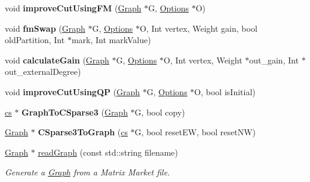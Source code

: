 \begin{DoxyCompactItemize}
\item 
\hypertarget{namespace_mongoose_acb49900518e10126690fb51a170ce20f}{}\label{namespace_mongoose_acb49900518e10126690fb51a170ce20f} 
void {\bfseries improve\+Cut\+Using\+FM} (\hyperlink{class_mongoose_1_1_graph}{Graph} $\ast$G, \hyperlink{struct_mongoose_1_1_options}{Options} $\ast$O)
\item 
\hypertarget{namespace_mongoose_af3413f738c2ef291db0d26e13c55bf48}{}\label{namespace_mongoose_af3413f738c2ef291db0d26e13c55bf48} 
void {\bfseries fm\+Swap} (\hyperlink{class_mongoose_1_1_graph}{Graph} $\ast$G, \hyperlink{struct_mongoose_1_1_options}{Options} $\ast$O, Int vertex, Weight gain, bool old\+Partition, Int $\ast$mark, Int mark\+Value)
\item 
\hypertarget{namespace_mongoose_aeae6a68c8c8d7f25fe15544d206a06aa}{}\label{namespace_mongoose_aeae6a68c8c8d7f25fe15544d206a06aa} 
void {\bfseries calculate\+Gain} (\hyperlink{class_mongoose_1_1_graph}{Graph} $\ast$G, \hyperlink{struct_mongoose_1_1_options}{Options} $\ast$O, Int vertex, Weight $\ast$out\+\_\+gain, Int $\ast$out\+\_\+external\+Degree)
\item 
\hypertarget{namespace_mongoose_a85b29287adbe15db49d766610de33013}{}\label{namespace_mongoose_a85b29287adbe15db49d766610de33013} 
void {\bfseries improve\+Cut\+Using\+QP} (\hyperlink{class_mongoose_1_1_graph}{Graph} $\ast$G, \hyperlink{struct_mongoose_1_1_options}{Options} $\ast$O, bool is\+Initial)
\item 
\hypertarget{namespace_mongoose_afad39ca8d0d45fa3690724df9f186532}{}\label{namespace_mongoose_afad39ca8d0d45fa3690724df9f186532} 
\hyperlink{struct_mongoose_1_1cs__sparse}{cs} $\ast$ {\bfseries Graph\+To\+C\+Sparse3} (\hyperlink{class_mongoose_1_1_graph}{Graph} $\ast$G, bool copy)
\item 
\hypertarget{namespace_mongoose_aaa577194ad5e0b36ef28329b26633dac}{}\label{namespace_mongoose_aaa577194ad5e0b36ef28329b26633dac} 
\hyperlink{class_mongoose_1_1_graph}{Graph} $\ast$ {\bfseries C\+Sparse3\+To\+Graph} (\hyperlink{struct_mongoose_1_1cs__sparse}{cs} $\ast$G, bool reset\+EW, bool reset\+NW)
\item 
\hyperlink{class_mongoose_1_1_graph}{Graph} $\ast$ \hyperlink{namespace_mongoose_a6dba86117ea57ef9d093db03e0e9a08d}{read\+Graph} (const std\+::string filename)
\begin{DoxyCompactList}\small\item\em Generate a \hyperlink{class_mongoose_1_1_graph}{Graph} from a Matrix Market file. \end{DoxyCompactList}\item 

\end{DoxyCompactItemize}

